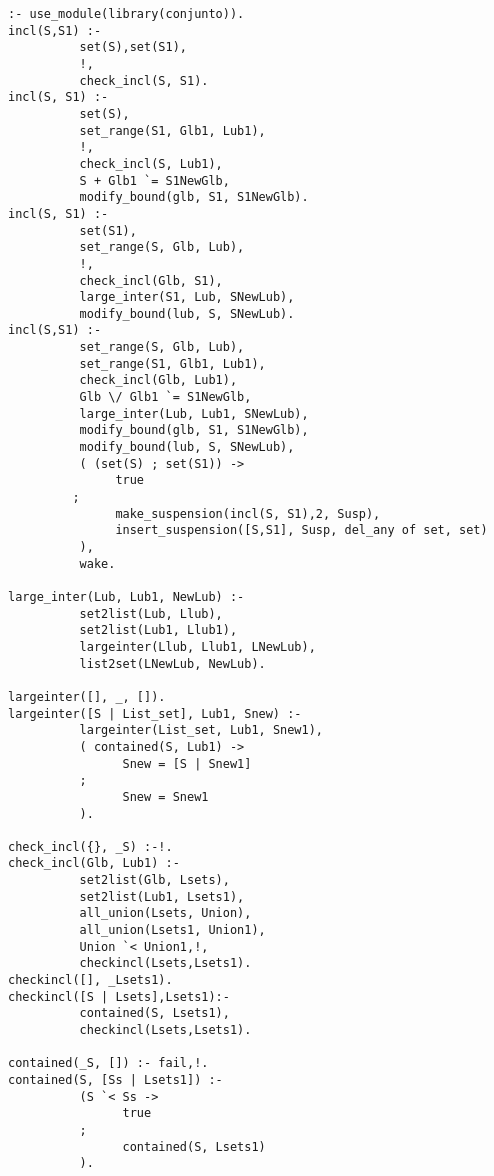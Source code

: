 \begin{verbatim}
:- use_module(library(conjunto)).
incl(S,S1) :-
          set(S),set(S1),
          !,
          check_incl(S, S1).
incl(S, S1) :-
          set(S),
          set_range(S1, Glb1, Lub1),
          !,
          check_incl(S, Lub1),
          S + Glb1 `= S1NewGlb,
          modify_bound(glb, S1, S1NewGlb).
incl(S, S1) :-
          set(S1),
          set_range(S, Glb, Lub),
          !,
          check_incl(Glb, S1),
          large_inter(S1, Lub, SNewLub),
          modify_bound(lub, S, SNewLub).
incl(S,S1) :-
          set_range(S, Glb, Lub),
          set_range(S1, Glb1, Lub1),
          check_incl(Glb, Lub1),
          Glb \/ Glb1 `= S1NewGlb,
          large_inter(Lub, Lub1, SNewLub),
          modify_bound(glb, S1, S1NewGlb),
          modify_bound(lub, S, SNewLub),
          ( (set(S) ; set(S1)) ->
               true
         ;
               make_suspension(incl(S, S1),2, Susp),
               insert_suspension([S,S1], Susp, del_any of set, set)
          ),
          wake.

large_inter(Lub, Lub1, NewLub) :-
          set2list(Lub, Llub),
          set2list(Lub1, Llub1),
          largeinter(Llub, Llub1, LNewLub),
          list2set(LNewLub, NewLub).

largeinter([], _, []).
largeinter([S | List_set], Lub1, Snew) :-
          largeinter(List_set, Lub1, Snew1),
          ( contained(S, Lub1) ->
                Snew = [S | Snew1]
          ;
                Snew = Snew1
          ).

check_incl({}, _S) :-!.
check_incl(Glb, Lub1) :-
          set2list(Glb, Lsets),
          set2list(Lub1, Lsets1),
          all_union(Lsets, Union),
          all_union(Lsets1, Union1),
          Union `< Union1,!,
          checkincl(Lsets,Lsets1).
checkincl([], _Lsets1).
checkincl([S | Lsets],Lsets1):-
          contained(S, Lsets1),
          checkincl(Lsets,Lsets1).

contained(_S, []) :- fail,!.
contained(S, [Ss | Lsets1]) :-
          (S `< Ss ->
                true
          ;
                contained(S, Lsets1)
          ).
\end{verbatim}

